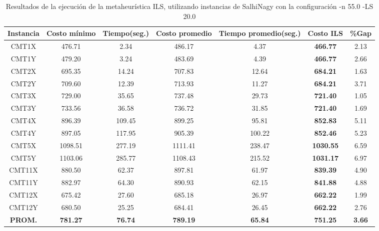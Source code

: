 \begin{table}[ht]
\caption{Resultados de la ejecución de la metaheurística ILS, utilizando instancias de SalhiNagy con la configuración -n 55.0 -LS 20.0}
\centering
\small
\begin{tabular}{c c c c c c c}
\hline\hline
Instancia & Costo mínimo & Tiempo(seg.) & Costo promedio & Tiempo promedio(seg.) & Costo ILS & \%Gap \\ [0.5ex]
\hline
CMT1X & 476.71 & 2.34 & 
486.17 & 4.37 & \bf{466.77} & 
2.13\\CMT1Y & 479.20 & 3.24 & 
483.69 & 4.39 & \bf{466.77} & 
2.66\\CMT2X & 695.35 & 14.24 & 
707.83 & 12.64 & \bf{684.21} & 
1.63\\CMT2Y & 709.60 & 12.39 & 
713.93 & 11.27 & \bf{684.21} & 
3.71\\CMT3X & 729.00 & 35.65 & 
737.48 & 29.73 & \bf{721.40} & 
1.05\\CMT3Y & 733.56 & 36.58 & 
736.72 & 31.85 & \bf{721.40} & 
1.69\\CMT4X & 896.39 & 109.45 & 
899.25 & 95.81 & \bf{852.83} & 
5.11\\CMT4Y & 897.05 & 117.95 & 
905.39 & 100.22 & \bf{852.46} & 
5.23\\CMT5X & 1098.51 & 277.19 & 
1111.41 & 238.47 & \bf{1030.55} & 
6.59\\CMT5Y & 1103.06 & 285.77 & 
1108.43 & 215.52 & \bf{1031.17} & 
6.97\\CMT11X & 880.50 & 62.37 & 
897.81 & 61.97 & \bf{839.39} & 
4.90\\CMT11Y & 882.97 & 64.30 & 
890.93 & 62.15 & \bf{841.88} & 
4.88\\CMT12X & 675.42 & 27.60 & 
685.18 & 26.97 & \bf{662.22} & 
1.99\\CMT12Y & 680.50 & 25.25 & 
684.41 & 26.45 & \bf{662.22} & 
2.76\\\bf{PROM.} & 
\bf{781.27} & \bf{76.74} & \bf{789.19} & \bf{65.84} & \bf{751.25} & \bf{3.66}\\[1ex]\hline
\end{tabular}
\label{table:nonlin}
\end{table} \clearpage
